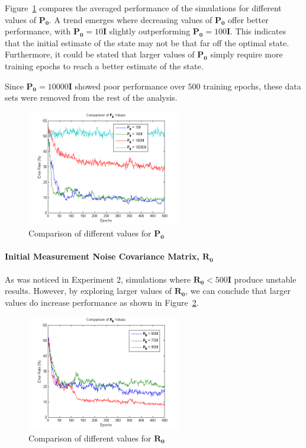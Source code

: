 \documentclass[11pt,letterpaper,titlepage]{article}
\numberwithin{equation}{section}
\numberwithin{figure}{section}
\numberwithin{table}{section}
\begin{document}
Figure~\ref{fig:mlpekf_compare_p} compares the averaged performance of the simulations for different values of \(\mathbf{P_0}\). A trend emerges where decreasing values of \(\mathbf{P_0}\) offer better performance, with \(\mathbf{P_0}=10\mathbf{I}\) slightly outperforming \(\mathbf{P_0}=100\mathbf{I}\). This indicates that the initial estimate of the state may not be that far off the optimal state. Furthermore, it could be stated that larger values of \(\mathbf{P_0}\) simply require more training epochs to reach a better estimate of the state. 

Since \(\mathbf{P_0}=10000\mathbf{I}\) showed poor performance over \(500\) training epochs, these data sets were removed from the rest of the analysis.

\begin{figure}[H]
  \centering
  \includegraphics[width=0.6\textwidth]{img/mlpekf_compare_p}
  \caption{Comparison of different values for \(\mathbf{P_0}\)}
  \label{fig:mlpekf_compare_p}
\end{figure}

\paragraph{Initial Measurement Noise Covariance Matrix, \(\mathbf{R_0}\)}
\label{sec:r_0}

As was noticed in Experiment 2, simulations where \(\mathbf{R_0} < 500\mathbf{I}\) produce unstable results. However, by exploring larger values of \(\mathbf{R_0}\), we can conclude that larger values do increase performance as shown in Figure~\ref{fig:mlpekf_compare_r_no_p10000}.

\begin{figure}[H]
  \centering
  \includegraphics[width=0.6\textwidth]{img/mlpekf_compare_r_no_p10000}
  \caption{Comparison of different values for \(\mathbf{R_0}\)}
  \label{fig:mlpekf_compare_r_no_p10000}
\end{figure}
\end{document}
